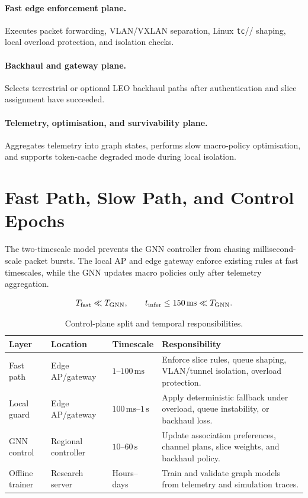 \paragraph{Fast edge enforcement plane.} Executes packet forwarding, VLAN/VXLAN separation, Linux \texttt{tc}/\htb{}/\fqcodel{} shaping, local overload protection, and isolation checks.

\paragraph{Backhaul and gateway plane.} Selects terrestrial or optional LEO backhaul paths after authentication and slice assignment have succeeded.

\paragraph{Telemetry, optimisation, and survivability plane.} Aggregates telemetry into graph states, performs slow macro-policy optimisation, and supports token-cache degraded mode during local isolation.

\section{Fast Path, Slow Path, and Control Epochs}
\label{sec:timescales}

The two-timescale model prevents the GNN controller from chasing millisecond-scale packet bursts. The local AP and edge gateway enforce existing rules at fast timescales, while the GNN updates macro policies only after telemetry aggregation.

\begin{equation}
  T_{\mathrm{fast}} \ll T_{\mathrm{GNN}}, \qquad t_{\mathrm{infer}} \leq 150\,\mathrm{ms} \ll T_{\mathrm{GNN}}.
  \label{eq:timescale-sep}
\end{equation}

\begin{table}[H]
  \centering
  \caption{Control-plane split and temporal responsibilities.}
  \label{tab:control-split}
  \begin{tabularx}{\textwidth}{lllX}
    \toprule
    \textbf{Layer} & \textbf{Location} & \textbf{Timescale} & \textbf{Responsibility} \\
    \midrule
    Fast path & Edge AP/gateway & $1$--$100\,\mathrm{ms}$ & Enforce slice rules, queue shaping, VLAN/tunnel isolation, overload protection. \\
    Local guard & Edge AP/gateway & $100\,\mathrm{ms}$--$1\,\mathrm{s}$ & Apply deterministic fallback under overload, queue instability, or backhaul loss. \\
    GNN control & Regional controller & $10$--$60\,\mathrm{s}$ & Update association preferences, channel plans, slice weights, and backhaul policy. \\
    Offline trainer & Research server & Hours--days & Train and validate graph models from telemetry and simulation traces. \\
    \bottomrule
  \end{tabularx}
\end{table}

